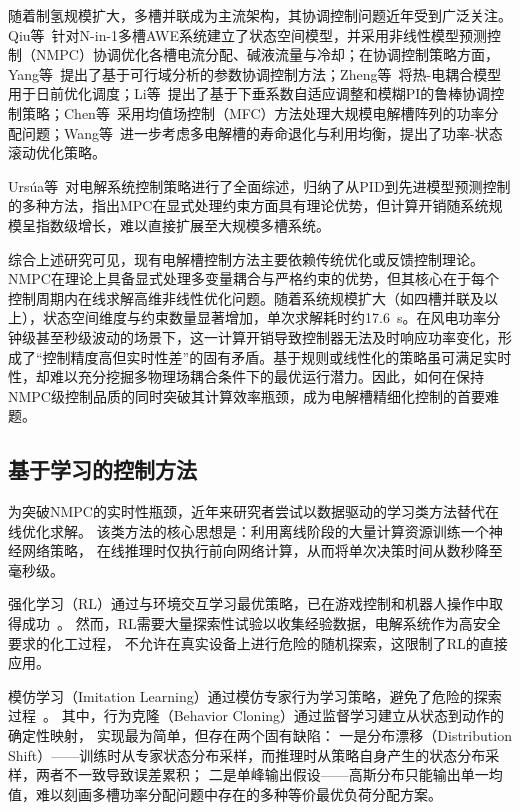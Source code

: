随着制氢规模扩大，多槽并联成为主流架构，其协调控制问题近年受到广泛关注。Qiu等~\cite{Qiu2025arXiv}针对N-in-1多槽AWE系统建立了状态空间模型，并采用非线性模型预测控制（NMPC）协调优化各槽电流分配、碱液流量与冷却；在协调控制策略方面，Yang等~\cite{Yang2025IJHE}提出了基于可行域分析的参数协调控制方法；Zheng等~\cite{Zheng2022AppliedEnergy}将热-电耦合模型用于日前优化调度；Li等~\cite{Li2025TPEL}提出了基于下垂系数自适应调整和模糊PI的鲁棒协调控制策略；Chen等~\cite{Chen2025TSTE}采用均值场控制（MFC）方法处理大规模电解槽阵列的功率分配问题；Wang等~\cite{Wang2025TSTE}进一步考虑多电解槽的寿命退化与利用均衡，提出了功率-状态滚动优化策略。

Urs\'{u}a等~\cite{Survey2024Hydrogen}对电解系统控制策略进行了全面综述，归纳了从PID到先进模型预测控制的多种方法，指出MPC在显式处理约束方面具有理论优势，但计算开销随系统规模呈指数级增长，难以直接扩展至大规模多槽系统。

综合上述研究可见，现有电解槽控制方法主要依赖传统优化或反馈控制理论。NMPC在理论上具备显式处理多变量耦合与严格约束的优势，但其核心在于每个控制周期内在线求解高维非线性优化问题。随着系统规模扩大（如四槽并联及以上），状态空间维度与约束数量显著增加，单次求解耗时约17.6~s。在风电功率分钟级甚至秒级波动的场景下，这一计算开销导致控制器无法及时响应功率变化，形成了``控制精度高但实时性差''的固有矛盾。基于规则或线性化的策略虽可满足实时性，却难以充分挖掘多物理场耦合条件下的最优运行潜力。因此，如何在保持NMPC级控制品质的同时突破其计算效率瓶颈，成为电解槽精细化控制的首要难题。

\subsection{基于学习的控制方法}

为突破NMPC的实时性瓶颈，近年来研究者尝试以数据驱动的学习类方法替代在线优化求解。
该类方法的核心思想是：利用离线阶段的大量计算资源训练一个神经网络策略，
在线推理时仅执行前向网络计算，从而将单次决策时间从数秒降至毫秒级。

强化学习（RL）通过与环境交互学习最优策略，已在游戏控制和机器人操作中取得成功~\cite{Mnih2015Nature}。
然而，RL需要大量探索性试验以收集经验数据，电解系统作为高安全要求的化工过程，
不允许在真实设备上进行危险的随机探索，这限制了RL的直接应用。

模仿学习（Imitation Learning）通过模仿专家行为学习策略，避免了危险的探索过程~\cite{Ross2011AISTATS}。
其中，行为克隆（Behavior Cloning）通过监督学习建立从状态到动作的确定性映射，
实现最为简单，但存在两个固有缺陷：
一是分布漂移（Distribution Shift）——训练时从专家状态分布采样，而推理时从策略自身产生的状态分布采样，两者不一致导致误差累积；
二是单峰输出假设——高斯分布只能输出单一均值，难以刻画多槽功率分配问题中存在的多种等价最优负荷分配方案。

